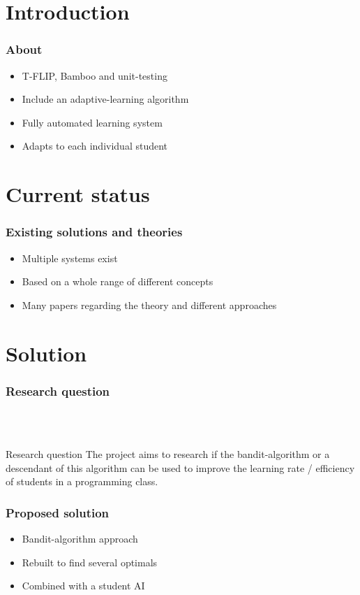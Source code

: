 \section{Introduction}


\begin{frame}
  \frametitle{About}

  \begin{itemize}
    \item T-FLIP, Bamboo and unit-testing
    \item Include an adaptive-learning algorithm
    \item Fully automated learning system
    \item Adapts to each individual student
  \end{itemize}
\end{frame}

\section{Current status}


\begin{frame}
  \frametitle{Existing solutions and theories}

  \begin{itemize}
    \item Multiple systems exist
    \item Based on a whole range of different concepts
    \item Many papers regarding the theory and different approaches
  \end{itemize}
\end{frame}




\section{Solution}


\begin{frame}
  \frametitle{Research question}
    \\
    \\
    \begin{block}{Research question}
        The project aims to research if the bandit-algorithm or a descendant of this algorithm can be used to improve the learning rate / efficiency of students in a programming class.
    \end{block}
\end{frame}


\begin{frame}
  \frametitle{Proposed solution}

  \begin{itemize}
    \item Bandit-algorithm approach
    \item Rebuilt to find several optimals
    \item Combined with a student AI
  \end{itemize}
\end{frame}


